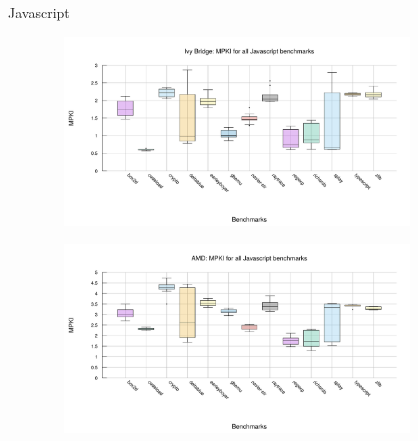 \documentclass[10pt]{beamer}
\begin{document}
\begin{frame}{Javascript}
	\begin{minipage}{\textwidth}
		\begin{figure}
        \includegraphics[width=10cm, height=5cm]{figures/javascript_box_ivy_bridge.pdf}
		\end{figure}
	\end{minipage}
		\begin{minipage}{\textwidth}
			\begin{figure}
				\includegraphics[width=10cm, height=5cm]{figures/javascript_box_amd.pdf}
			\end{figure}
		\end{minipage}
\end{frame}
\end{document}
